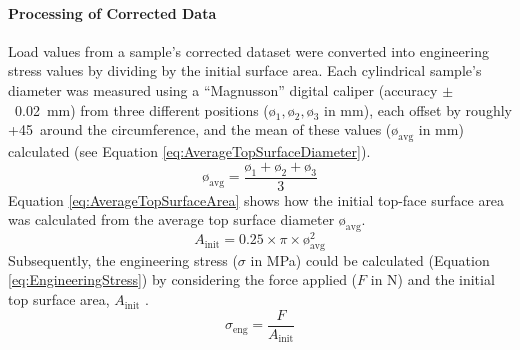\paragraph{Processing of Corrected Data}
Load values from a sample's corrected dataset were converted into
 engineering stress values by dividing by the initial surface area.
Each cylindrical sample's diameter was measured using a ``Magnusson''
 digital caliper (accuracy \(\pm\)~0.02~\unit{\milli\metre}) from three
 different positions (\(\text{ø}_{1},\text{ø}_{2},\text{ø}_{3}\)
 in \unit{\milli\metre}), each offset by roughly +45\degree~around the
 circumference, and the mean of these values (\(\text{ø}_{\mathrm{avg}}\) in
 \unit{\milli\metre}) calculated (see Equation
 \ref{eq:AverageTopSurfaceDiameter}).
\begin{equation}\label{eq:AverageTopSurfaceDiameter}
    \text{ø}_{\mathrm{avg}} = \frac{\text{ø}_{1}+\text{ø}_{2}+\text{ø}_{3}}{3}
\end{equation}
Equation \ref{eq:AverageTopSurfaceArea} shows how the initial top-face
 surface area was calculated from the average top surface diameter
 \(\text{ø}_{\mathrm{avg}}\).
 \begin{equation}\label{eq:AverageTopSurfaceArea}
    A_{\mathrm{init}} = 0.25 \times \pi \times \text{ø}_{\mathrm{avg}}^{2}
\end{equation}
Subsequently, the engineering stress (\(\sigma\) in \unit{\mega\pascal}) could
 be calculated (Equation \ref{eq:EngineeringStress}) by considering the
 force applied (\(F\) in \unit{\newton}) and the initial top surface area,
 \(A_{\mathrm{init}}\) \autocite{Martin2006}.
\begin{equation}\label{eq:EngineeringStress}
    \sigma _{\mathrm{eng}} =\frac{F}{A_{\mathrm{init}}}
\end{equation}

